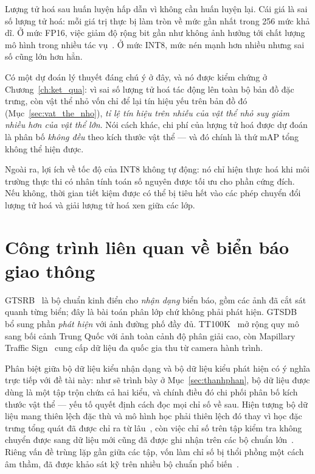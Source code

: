 Lượng tử hoá sau huấn luyện hấp dẫn vì không cần huấn luyện lại. Cái giá là sai số lượng tử hoá:
mỗi giá trị thực bị làm tròn về mức gần nhất trong 256 mức khả dĩ. Ở mức FP16, việc giảm độ rộng
bit gần như không ảnh hưởng tới chất lượng mô hình trong nhiều tác
vụ~\cite{micikevicius2018mixedprecision}. Ở mức INT8, mức nén mạnh hơn nhiều nhưng sai số cũng lớn
hơn hẳn.

Có một dự đoán lý thuyết đáng chú ý ở đây, và nó được kiểm chứng ở Chương~\ref{ch:ket_qua}: vì sai
số lượng tử hoá tác động lên toàn bộ bản đồ đặc trưng, còn vật thể nhỏ vốn chỉ để lại tín hiệu yếu
trên bản đồ đó (Mục~\ref{sec:vat_the_nho}), \emph{tỉ lệ tín hiệu trên nhiễu của vật thể nhỏ suy
giảm nhiều hơn của vật thể lớn}. Nói cách khác, chi phí của lượng tử hoá được dự đoán là phân bố
\emph{không đều} theo kích thước vật thể --- và đó chính là thứ mAP tổng không thể hiện được.

Ngoài ra, lợi ích về tốc độ của INT8 không tự động: nó chỉ hiện thực hoá khi môi trường thực thi có
nhân tính toán số nguyên được tối ưu cho phần cứng đích. Nếu không, thời gian tiết kiệm được có thể
bị tiêu hết vào các phép chuyển đổi lượng tử hoá và giải lượng tử hoá xen giữa các lớp.

\section{Công trình liên quan về biển báo giao thông}

GTSRB~\cite{stallkamp2012gtsrb} là bộ chuẩn kinh điển cho \emph{nhận dạng} biển báo, gồm các ảnh đã
cắt sát quanh từng biển; đây là bài toán phân lớp chứ không phải phát hiện.
GTSDB~\cite{houben2013gtsdb} bổ sung phần \emph{phát hiện} với ảnh đường phố đầy đủ.
TT100K~\cite{zhu2016tt100k} mở rộng quy mô sang bối cảnh Trung Quốc với ảnh toàn cảnh độ phân giải
cao, còn Mapillary Traffic Sign~\cite{ertler2020mapillary} cung cấp dữ liệu đa quốc gia thu từ
camera hành trình.

Phân biệt giữa bộ dữ liệu kiểu nhận dạng và bộ dữ liệu kiểu phát hiện có ý nghĩa trực tiếp với đề
tài này: như sẽ trình bày ở Mục~\ref{sec:thanhphan}, bộ dữ liệu được dùng là một tập trộn chứa cả
hai kiểu, và chính điều đó chi phối phân bố kích thước vật thể --- yếu tố quyết định cách đọc mọi
chỉ số về sau. Hiện tượng bộ dữ liệu mang thiên lệch đặc thù và mô hình học phải thiên lệch đó thay
vì học đặc trưng tổng quát đã được chỉ ra từ lâu~\cite{torralba2011bias}, còn việc chỉ số trên tập
kiểm tra không chuyển được sang dữ liệu mới cũng đã được ghi nhận trên các bộ chuẩn
lớn~\cite{recht2019imagenetv2}. Riêng vấn đề trùng lặp gần giữa các tập, vốn làm chỉ số bị thổi
phồng một cách âm thầm, đã được khảo sát kỹ trên nhiều bộ chuẩn phổ biến~\cite{barz2020duplicates}.

